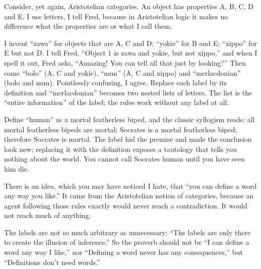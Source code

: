 
Consider, yet again, Aristotelian categories. An object has properties A, B, C, D and E. I use letters, I tell Fred, because in Aristotelian logic it makes no difference what the properties are or what I call them.

I invent ``zawa'' for objects that are A, C and D; ``yokie'' for B and E; ``xippo'' for E but not D. I tell Fred, ``Object 1 is zawa and yokie, but not xippo,'' and when I spell it out, Fred asks, ``Amazing! You can tell all that just by looking?'' Then come ``bolo'' (A, C and yokie), ``mun'' (A, C and xippo) and ``merlacdonian'' (bolo and mun). Pointlessly confusing, I agree. Replace each label by its definition and ``merlacdonian'' becomes two nested lists of letters. The list is the ``entire information'' of the label; the rules work without any label at all.

Define ``human'' as a mortal featherless biped, and the classic syllogism reads: all mortal featherless bipeds are mortal; Socrates is a mortal featherless biped; therefore Socrates is mortal. The label hid the premise and made the conclusion look new; replacing it with the definition exposes a tautology that tells you nothing about the world. You cannot call Socrates human until you have seen him die. 

There is an idea, which you may have noticed I hate, that ``you can define a word any way you like.'' It came from the Aristotelian notion of categories, because an agent following those rules exactly would never reach a contradiction. It would not reach much of anything. 

The labels are not so much arbitrary as unnecessary: ``The labels are only there to create the illusion of inference.''  So the proverb should not be ``I can define a word any way I like,'' nor ``Defining a word never has any consequences,'' but ``Definitions don't need words.''
